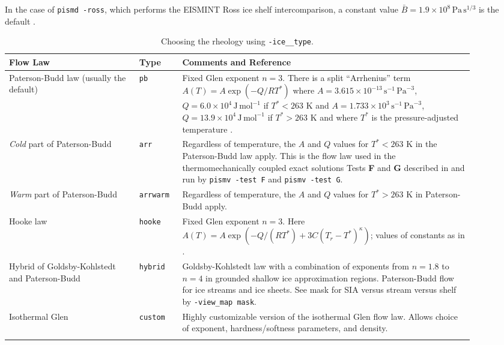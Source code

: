 \documentclass[11pt,final]{amsart}
\renewcommand{\t}[1]{\texttt{#1}}
\newcommand{\und}{\_\!\_}
\begin{document}
In the case of \verb|pismd -ross|, which performs the EISMINT Ross ice shelf intercomparison, a constant value $\bar B = 1.9 \times 10^8 \, \text{Pa}\, \text{s}^{1/3}$ is the default \cite{MacAyealetal}.

\begin{table}[ht]
\caption{Choosing the rheology using \t{-ice\und type}.}\label{tab:flowlaw}
\small
\begin{tabular}{p{0.25\linewidth}p{0.08\linewidth}p{0.57\linewidth}}\hline
\textbf{Flow Law} & \textbf{Type} & \textbf{Comments and Reference} \\ \hline
Paterson-Budd law (usually the default)  &  \t{pb} &   Fixed Glen exponent $n=3$.  There is a split ``Arrhenius'' term $A(T) = A \exp(-Q/RT^*)$ where \mbox{$A = 3.615 \times 10^{-13}\, \text{s}^{-1}\, \text{Pa}^{-3}$}, \mbox{$Q = 6.0 \times 10^4\, \text{J}\, \text{mol}^{-1}$} if $T^* < 263$ K and
 \mbox{$A = 1.733 \times 10^{3}\, \text{s}^{-1}\, \text{Pa}^{-3}$}, \mbox{$Q = 13.9 \times 10^4\, \text{J}\, \text{mol}^{-1}$} if $T^* > 263$ K and where $T^*$ is the pressure-adjusted temperature \cite{PatersonBudd}. \\
\emph{Cold} part of Paterson-Budd &  \t{arr} &   Regardless of temperature, the $A$ and $Q$ values for $T^*<263$ K in  the Paterson-Budd law apply.  This is the flow law used in the thermomechanically coupled exact solutions Tests \textbf{F} and \textbf{G} described in \cite{BBL,BB} and run by \verb|pismv -test F| and \verb|pismv -test G|. \\

\emph{Warm} part of Paterson-Budd     &  \t{arrwarm} & Regardless of temperature, the $A$ and $Q$ values for $T^*>263$ K in Paterson-Budd apply.\\
Hooke law   &  \t{hooke} &  Fixed Glen exponent $n=3$.  Here  $A(T) = A \exp(-Q/(RT^*) + 3C (T_r - T^*)^\kappa)$; values of  constants as in \cite{Hooke,PayneBaldwin}.\\
Hybrid of Goldsby-Kohlstedt and Paterson-Budd & \t{hybrid} &     Goldsby-Kohlstedt law with a combination of exponents  from $n=1.8$ to $n=4$ \cite{GoldsbyKohlstedt} in grounded  shallow ice approximation regions.  Paterson-Budd flow  for ice streams and ice sheets. See mask for SIA versus stream versus shelf by \verb|-view_map mask|. \\
Isothermal Glen & \t{custom} & Highly customizable version of the isothermal Glen flow law.  Allows choice of exponent, hardness/softness parameters, and density. \\
\hline
\normalsize	
\end{tabular}
\end{table}
\end{document}
